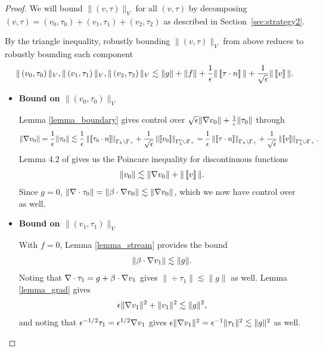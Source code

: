 \begin{proof}
We will bound $\|\left(v,\tau\right)\|_V$ for all $\left(v,\tau\right)$ by decomposing $\left(v,\tau\right) = \left(v_0,\tau_0\right) + \left(v_1,\tau_1\right) + \left(v_2,\tau_2\right)$ as described in Section~\ref{sec:strategy2}. 

By the triangle inequality, robustly bounding $\|\left(v,\tau\right)\|_V$ from above reduces to robustly bounding each component 
\[
\|\left(v_{0},\tau_{0}\right)\|_V, \|\left(v_{1},\tau_{1}\right)\|_V, \|\left(v_{2},\tau_{2}\right)\|_V \lesssim \|g\| + \|f\| + \frac{1}{\epsilon}\|\jump{\tau\cdot n}\| + \frac{1}{\sqrt{\epsilon}}\|\jump{v}\|.
\]


\begin{itemize}
\item \textbf{Bound on $\|\left(v_{0},\tau_{0}\right)\|_V$}
 
Lemma \ref{lemma_boundary} gives control over $\sqrt{\epsilon}\|\grad v_0\| + \frac{1}{\epsilon}\|\tau_0\|$ through
\[
\|\grad v_0\| = \frac{1}{\epsilon}\|\tau_0\| \lesssim \frac{1}{\epsilon} \nor{\jump{\tau_0\cdot n}}_{\Gamma_h \setminus \Gamma_+} + \frac{1}{\sqrt{\epsilon}} \nor{\jump{v_0}}_{\Gamma_h^0 \cup \Gamma_+} = \frac{1}{\epsilon} \nor{ \jump{\tau\cdot n}}_{\Gamma_h \setminus \Gamma_+} + \frac{1}{\sqrt{\epsilon}} \nor{ \jump{v}}_{\Gamma_h^0 \cup \Gamma_+}.
\]
Lemma 4.2 of \cite{analysisDPG} gives us the Poincare inequality for discontinuous functions
\[
\|v_0\| \lesssim \|\grad v_0\| + \|\jump{v}\|.
\]
Since $g = 0$, $\| \div \tau_0\| = \|\beta\cdot \grad v_0\|\lesssim \|\grad v_0\|$, which we now have control over as well.  

\item \textbf{Bound on $\|\left(v_{1},\tau_{1}\right)\|_V$}

With $f = 0$, Lemma \ref{lemma_stream} provides the bound
\[
\|\beta \cdot \grad v_1 \| \lesssim \| g\|.
\]
Noting that $\div \tau_1 = g+\beta\cdot \grad v_1$ gives $\|\div \tau_1 \| \lesssim \|g\|$ as well.  Lemma \ref{lemma_grad} gives
\[
\epsilon \|\grad v_1\|^2 + \|v_1\|^2 \lesssim \|g\|^2,
\]
and noting that $\epsilon^{-1/2}\tau_1 = \epsilon^{1/2}\grad v_1$ gives $\epsilon\|\grad v_1\|^2 = \epsilon^{-1}\|\tau_1\|^2 \lesssim \|g\|^2$ as well.


\end{itemize}
\end{proof}
